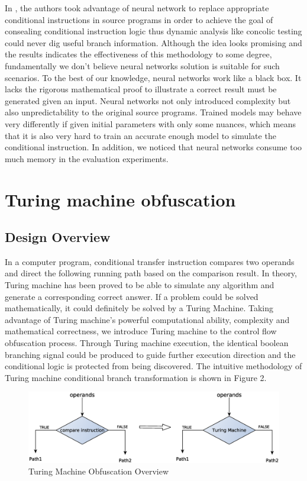 \documentclass[lnicst]{svmultln}
\begin{document}
In \cite{Ma}, the authors took advantage of neural network to replace appropriate conditional instructions in source programs in order to achieve the goal of consealing conditional instruction logic thus dynamic analysis like concolic testing could never dig useful branch information. Although the idea looks promising and the results indicates the effectiveness of this methodology to some degree, fundamentally we don't believe neural networks solution is suitable for such scenarios. To the best of our knowledge,
neural networks work like a black box. It lacks the rigorous mathematical proof to illustrate a correct result must be generated given an input. Neural networks not only introduced complexity but also unpredictability to the original source programs. Trained models may behave very differently if given initial parameters with only some nuances, which means that it is also very hard to train an accurate enough model to simulate the conditional instruction. In addition, we noticed that neural networks consume too much memory in the evaluation experiments.

%
\section{Turing machine obfuscation}
%
\subsection{Design Overview}
In a computer program, conditional transfer instruction compares two operands and direct the following running path based on the comparison result. In theory, Turing machine has been proved to be able to simulate any algorithm and generate a corresponding correct answer. If a problem could be solved mathematically, it could definitely be solved by a Turing Machine. Taking advantage of Turing machine's powerful computational ability, complexity and mathematical correctness, we introduce Turing machine to the control flow obfuscation process. Through Turing machine execution, the identical boolean branching signal could be produced to guide further execution direction and the conditional logic is protected from being discovered. The intuitive methodology of Turing machine conditional branch transformation is shown in Figure 2.
\begin{figure}
 \includegraphics[width=\linewidth]{figure2.eps}
 \caption{Turing Machine Obfuscation Overview}
 \label{Figure 2}
\end{figure}
\end{document}

